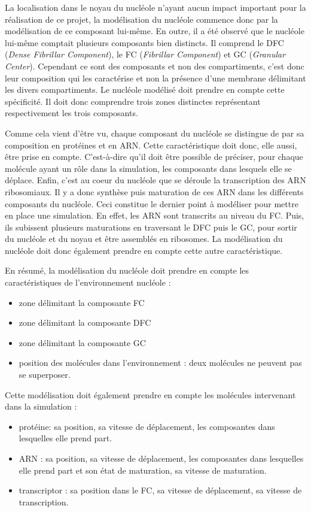La localisation dans le noyau du nucléole n'ayant aucun impact
important pour la réalisation de ce projet, la modélisation du
nucléole commence donc par la modélisation de ce composant
lui-même. En outre, il a été observé que le nucléole lui-même comptait
plusieurs composants bien distincts. Il comprend le DFC (\textit{Dense
  Fibrillar Component}), le FC (\textit{Fibrillar Component}) et GC
(\textit{Granular Center}). Cependant ce sont des composants et non
des compartiments, c'est donc leur composition qui les caractérise et
non la présence d'une membrane délimitant les divers compartiments. Le
nucléole modélisé doit prendre en compte cette spécificité. Il doit
donc comprendre trois zones distinctes représentant respectivement les
trois composants.

Comme cela vient d'être vu, chaque composant du nucléole se distingue
de par sa composition en protéines et en ARN. Cette caractéristique
doit donc, elle aussi, être prise en compte. C'est-à-dire qu'il doit
être possible de préciser, pour chaque molécule ayant un rôle dans la
simulation, les composants dans lesquels elle se déplace. Enfin, c'est
au coeur du nucléole que se déroule la transcription des ARN
ribosomiaux. Il y a donc synthèse puis maturation de ces ARN dans les
différents composants du nucléole. Ceci constitue le dernier point à
modéliser pour mettre en place une simulation. En effet, les ARN sont
transcrits au niveau du FC. Puis, ils subissent plusieurs maturations
en traversant le DFC puis le GC, pour sortir du nucléole et du noyau et
être assemblés en ribosomes. La modélisation du nucléole doit donc
également prendre en compte cette autre caractéristique.

En résumé, la modélisation du nucléole doit prendre en compte les
caractéristiques de l'environnement \og{}nucléole\fg{} :

\begin{itemize}
	\item zone délimitant la composante FC
	\item zone délimitant la composante DFC
	\item zone délimitant la composante GC
	\item position des molécules dans l'environnement : deux molécules
      ne peuvent pas se superposer.
\end{itemize}

Cette modélisation doit également prendre en compte les molécules
intervenant dans la simulation :

\begin{itemize}
\item protéine: sa position, sa vitesse de déplacement, les
  composantes dans lesquelles elle prend part.
\item ARN : sa position, sa vitesse de déplacement, les composantes
  dans lesquelles elle prend part et son état de maturation, sa
  vitesse de maturation.
\item \og{}transcriptor\fg{} : sa position dans le FC, sa vitesse de
  déplacement, sa vitesse de \og{}transcription\fg{}.
\end{itemize}

